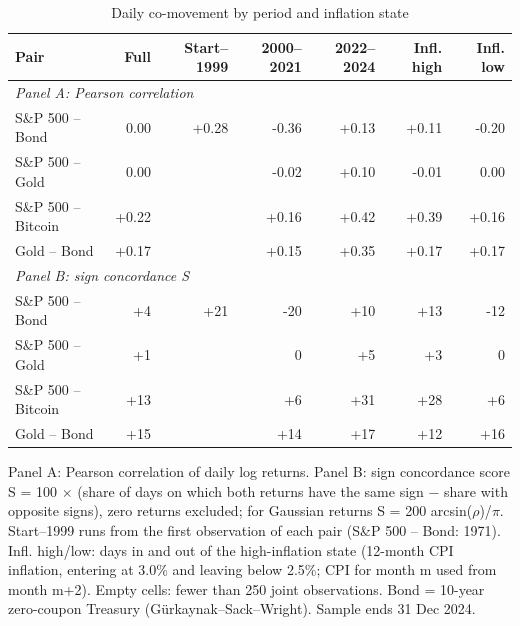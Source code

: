 \begin{table}[t]
\centering
\scriptsize
\setlength{\tabcolsep}{4pt}
\caption{Daily co-movement by period and inflation state}
\label{tab:tab_comovement}
\begin{tabular}{lrrrrrr}
\toprule
Pair & Full & Start–1999 & 2000–2021 & 2022–2024 & Infl. high & Infl. low \\
\midrule
\multicolumn{7}{l}{\textit{Panel A: Pearson correlation}} \\
\addlinespace[2pt]
S\&P 500 – Bond & 0.00 & +0.28 & -0.36 & +0.13 & +0.11 & -0.20 \\
S\&P 500 – Gold & 0.00 &  & -0.02 & +0.10 & -0.01 & 0.00 \\
S\&P 500 – Bitcoin & +0.22 &  & +0.16 & +0.42 & +0.39 & +0.16 \\
Gold – Bond & +0.17 &  & +0.15 & +0.35 & +0.17 & +0.17 \\
\midrule
\multicolumn{7}{l}{\textit{Panel B: sign concordance S}} \\
\addlinespace[2pt]
S\&P 500 – Bond & +4 & +21 & -20 & +10 & +13 & -12 \\
S\&P 500 – Gold & +1 &  & 0 & +5 & +3 & 0 \\
S\&P 500 – Bitcoin & +13 &  & +6 & +31 & +28 & +6 \\
Gold – Bond & +15 &  & +14 & +17 & +12 & +16 \\
\bottomrule
\end{tabular}
\par\smallskip
\parbox{\linewidth}{\footnotesize Panel A: Pearson correlation of daily log returns. Panel B: sign concordance score S = 100 $\times$ (share of days on which both returns have the same sign $-$ share with opposite signs), zero returns excluded; for Gaussian returns S = 200 arcsin($\rho$)/$\pi$. Start--1999 runs from the first observation of each pair (S\&P 500 -- Bond: 1971). Infl. high/low: days in and out of the high-inflation state (12-month CPI inflation, entering at 3.0\% and leaving below 2.5\%; CPI for month m used from month m+2). Empty cells: fewer than 250 joint observations. Bond = 10-year zero-coupon Treasury (G\"urkaynak--Sack--Wright). Sample ends 31 Dec 2024.}
\end{table}
